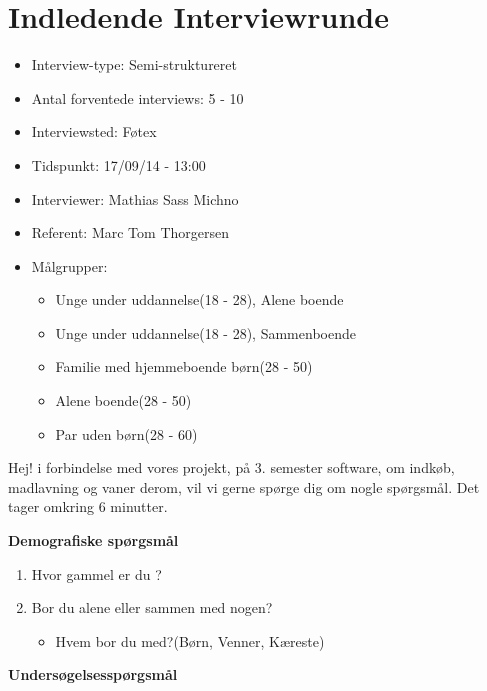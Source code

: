 \chapter{Indledende Interviewrunde}

\begin{itemize}[nolistsep,noitemsep]
	\setlength{\itemsep}{0em}
   \item Interview-type: Semi-struktureret
   \item Antal forventede interviews: 5 - 10
   \item Interviewsted: Føtex
   \item Tidspunkt: 17/09/14 - 13:00
   \item Interviewer: Mathias Sass Michno
   \item Referent: Marc Tom Thorgersen
   \item Målgrupper:
   	\begin{itemize}[nolistsep,noitemsep]
   		\item Unge under uddannelse(18 - 28), Alene boende
   		\item Unge under uddannelse(18 - 28), Sammenboende
   		\item Familie med hjemmeboende børn(28 - 50)
	    \item Alene boende(28 - 50)
   		\item Par uden børn(28 - 60)	
   	\end{itemize} 
\end{itemize}

Hej! i forbindelse med vores projekt, på 3. semester software, om indkøb, madlavning og vaner derom,  vil vi gerne spørge dig om nogle spørgsmål. Det tager omkring 6 minutter.

\textbf{Demografiske spørgsmål}
\begin{enumerate}[topsep=0ex]
	\setlength{\itemsep}{0em}
	\item  Hvor gammel er du ?
	\item  Bor du alene eller sammen med nogen?
	\begin{itemize}
	\item Hvem bor du med?(Børn, Venner, Kæreste)
	\end{itemize} 
\end{enumerate}

\textbf{Undersøgelsesspørgsmål}
		   

